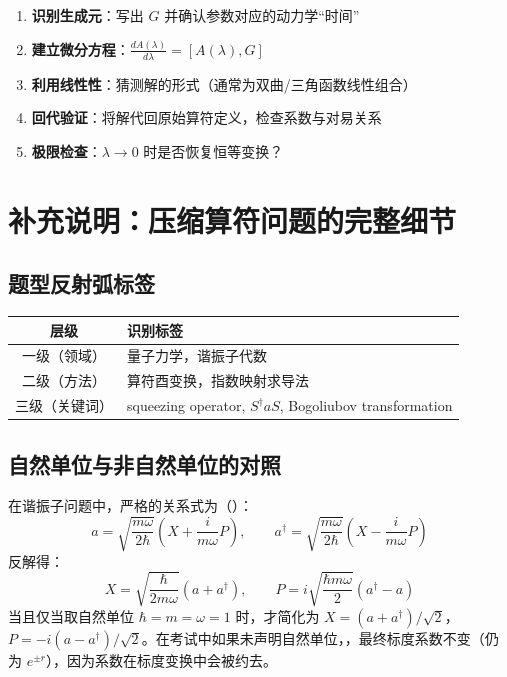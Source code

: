 \begin{thinkbox}
\begin{enumerate}
    \item \textbf{识别生成元}：写出 $G$ 并确认参数对应的动力学``时间''
    \item \textbf{建立微分方程}：$\displaystyle \frac{dA(\lambda)}{d\lambda} = [A(\lambda), G]$
    \item \textbf{利用线性性}：猜测解的形式（通常为双曲/三角函数线性组合）
    \item \textbf{回代验证}：将解代回原始算符定义，检查系数与对易关系
    \item \textbf{极限检查}：$\lambda \to 0$ 时是否恢复恒等变换？
\end{enumerate}
\end{thinkbox}

\newpage
\section[【补】压缩算符]{补充说明：压缩算符问题的完整细节}

\subsection{题型反射弧标签}

\begin{center}
\begin{tabular}{|c|l|}
\hline
\textbf{层级} & \textbf{识别标签} \\
\hline
一级（领域） & 量子力学，谐振子代数 \\
二级（方法） & 算符酉变换，指数映射求导法 \\
三级（关键词） & squeezing operator, $S^\dagger a S$, Bogoliubov transformation \\
\hline
\end{tabular}
\end{center}


\subsection{自然单位与非自然单位的对照}

在谐振子问题中，严格的关系式为（）：
\[
a = \sqrt{\frac{m\omega}{2\hbar}} \left( X + \frac{i}{m\omega} P \right), \qquad
a^\dagger = \sqrt{\frac{m\omega}{2\hbar}} \left( X - \frac{i}{m\omega} P \right)
\]
反解得：
\[
X = \sqrt{\frac{\hbar}{2m\omega}} (a + a^\dagger), \qquad
P = i\sqrt{\frac{\hbar m\omega}{2}} (a^\dagger - a)
\]
当且仅当取自然单位 $\hbar = m = \omega = 1$ 时，才简化为 $X = (a + a^\dagger)/\sqrt{2}$，$P = -i(a - a^\dagger)/\sqrt{2}$。在考试中如果未声明自然单位，，最终标度系数不变（仍为 $e^{\pm r}$），因为系数在标度变换中会被约去。

